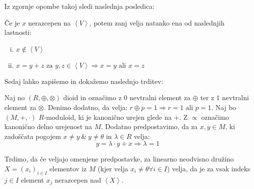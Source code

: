 \documentclass[mat1]{fmfdelo}
\newcommand{\Gen}[1]{\ensuremath{\left<{#1}\right>}}
\begin{document}
Iz zgornje opombe takoj sledi naslednja posledica:
\begin{posledica}
	\label{pos:nerazcep}
	Če je $x$ nerazcepen na \Gen{V}, potem zanj velja natanko ena od naslednjih lastnosti:
	\begin{enumerate}[(i)] 
		\item $x \notin \Gen{V}$
		\item $x = y + z \text{~za~} y, z\in\Gen{V}\Rightarrow x = y \text{~ali~} x = z$
	\end{enumerate}
\end{posledica}

Sedaj lahko zapišemo in dokažemo naslednjo trditev:
\begin{trditev}
	\label{trd:potrebzanerazcep}
	Naj no $(R, \oplus, \otimes)$ dioid in označimo z $0$ nevtralni element za $\oplus$ ter z $1$ nevtralni element za $\otimes$. Denimo dodatno, da velja: $r\oplus p = 1 \Rightarrow r = 1 \text{~ali~} p=1$. 
	Naj bo $(M, +, \cdot)$ $R$-moduloid, ki je kanonično urejen glede na $+$. Z $\varpropto$ označimo kanonično delno urejenost na $M$. Dodatno predpostavimo, da za $x, y\in M$, ki zadoščata pogojem $x \neq y ~\&~ y\neq\theta$ in $\lambda\in R$ velja: $$y = \lambda\cdot y + x \Rightarrow \lambda = 1$$
	
	Trdimo, da če veljajo omenjene predpostavke, za linearno neodvisno družino \newline $X = (x_i)_{i\in I}$ elementov iz $M$ (kjer velja $x_i \neq \theta \forall i\in I$) velja, da je za vsak indeks $j\in I$ element $x_j$ nerazcepen nad \Gen{X}.
\end{trditev}
\end{document}

